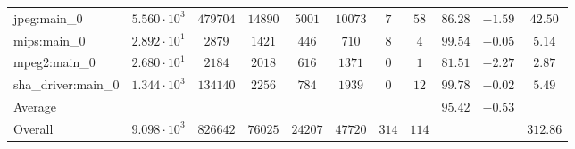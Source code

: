 \begin{tabular}{|l|c|c|c|c|c|c|c|c|c|c|}
jpeg:main\_0            & $ 5.560 \cdot 10^{3} $ & $ 479704 $ & $ 14890 $ & $ 5001  $ & $ 10073 $ & $ 7   $ & $ 58  $ & $ 86.28       $ & $ -1.59   $ & $ 42.50   $ \\
mips:main\_0            & $ 2.892 \cdot 10^{1} $ & $ 2879   $ & $ 1421  $ & $ 446   $ & $ 710   $ & $ 8   $ & $ 4   $ & $ 99.54       $ & $ -0.05   $ & $ 5.14    $ \\
mpeg2:main\_0           & $ 2.680 \cdot 10^{1} $ & $ 2184   $ & $ 2018  $ & $ 616   $ & $ 1371  $ & $ 0   $ & $ 1   $ & $ 81.51       $ & $ -2.27   $ & $ 2.87    $ \\
sha\_driver:main\_0     & $ 1.344 \cdot 10^{3} $ & $ 134140 $ & $ 2256  $ & $ 784   $ & $ 1939  $ & $ 0   $ & $ 12  $ & $ 99.78       $ & $ -0.02   $ & $ 5.49    $ \\
\hline
Average                 & $                    $ & $        $ & $       $ & $       $ & $       $ & $     $ & $     $ & $ 95.42       $ & $ -0.53   $ & $         $ \\
\hline
Overall                 & $ 9.098 \cdot 10^{3} $ & $ 826642 $ & $ 76025 $ & $ 24207 $ & $ 47720 $ & $ 314 $ & $ 114 $ & $             $ & $         $ & $ 312.86  $ \\
\hline
\end{tabular}
